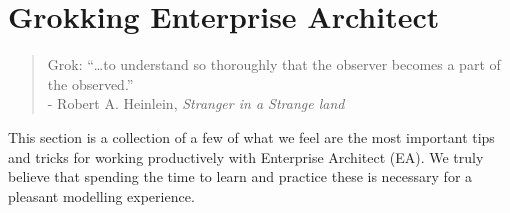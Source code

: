 \newpage
\section{Grokking Enterprise Architect}
\visHeader

\vspace*{0.5cm}

\begin{quote} {\small Grok: ``\ldots to understand so thoroughly that the observer becomes a part of the observed.''\\
\hspace*{3.2cm} - Robert A. Heinlein, \emph{Stranger in a Strange land}}
\end{quote}

\vspace{0.5cm}

This section is a collection of a few of what we feel are the most important tips and tricks for working productively with Enterprise Architect (EA).  We truly
believe that spending the time to learn and practice these is necessary for a pleasant modelling experience.

\vspace{0.5cm}

















